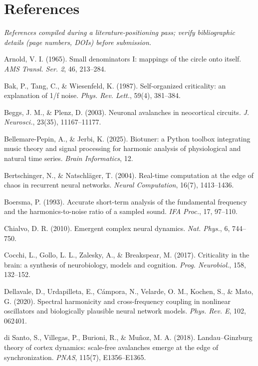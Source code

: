 \documentclass[11pt]{article}
\begin{document}
\section*{References}
\textit{\small References compiled during a literature-positioning pass; verify bibliographic details (page numbers, DOIs) before submission.}\par\vspace{4pt}
\begingroup\small
\begin{list}{}{\setlength{\itemsep}{1pt}\setlength{\leftmargin}{1.2em}\setlength{\itemindent}{-1.2em}}
\item Arnold, V. I. (1965). Small denominators I: mappings of the circle onto itself. \emph{AMS Transl. Ser. 2}, 46, 213–284.
\item Bak, P., Tang, C., \& Wiesenfeld, K. (1987). Self-organized criticality: an explanation of 1/f noise. \emph{Phys. Rev. Lett.}, 59(4), 381–384.
\item Beggs, J. M., \& Plenz, D. (2003). Neuronal avalanches in neocortical circuits. \emph{J. Neurosci.}, 23(35), 11167–11177.
\item Bellemare-Pepin, A., \& Jerbi, K. (2025). Biotuner: a Python toolbox integrating music theory and signal processing for harmonic analysis of physiological and natural time series. \emph{Brain Informatics}, 12.
\item Bertschinger, N., \& Natschläger, T. (2004). Real-time computation at the edge of chaos in recurrent neural networks. \emph{Neural Computation}, 16(7), 1413–1436.
\item Boersma, P. (1993). Accurate short-term analysis of the fundamental frequency and the harmonics-to-noise ratio of a sampled sound. \emph{IFA Proc.}, 17, 97–110.
\item Chialvo, D. R. (2010). Emergent complex neural dynamics. \emph{Nat. Phys.}, 6, 744–750.
\item Cocchi, L., Gollo, L. L., Zalesky, A., \& Breakspear, M. (2017). Criticality in the brain: a synthesis of neurobiology, models and cognition. \emph{Prog. Neurobiol.}, 158, 132–152.
\item Dellavale, D., Urdapilleta, E., Cámpora, N., Velarde, O. M., Kochen, S., \& Mato, G. (2020). Spectral harmonicity and cross-frequency coupling in nonlinear oscillators and biologically plausible neural network models. \emph{Phys. Rev. E}, 102, 062401.
\item di Santo, S., Villegas, P., Burioni, R., \& Muñoz, M. A. (2018). Landau–Ginzburg theory of cortex dynamics: scale-free avalanches emerge at the edge of synchronization. \emph{PNAS}, 115(7), E1356–E1365.

\end{list}
\end{document}
